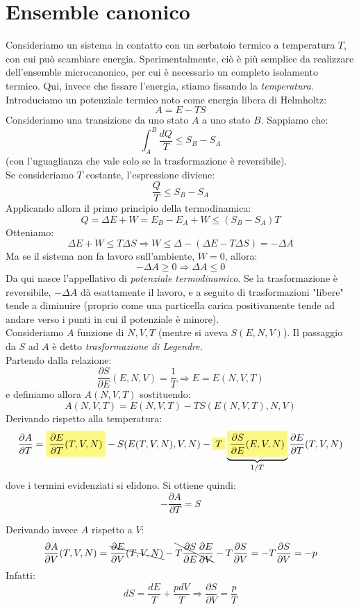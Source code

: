 \documentclass[12pt]{article}
\begin{document}
\section{Ensemble canonico}
Consideriamo un sistema in contatto con un serbatoio termico a temperatura $T$, con cui può scambiare energia. Sperimentalmente, ciò è più semplice da realizzare dell'ensemble microcanonico, per cui è necessario un completo isolamento termico. Qui, invece che fissare l'energia, stiamo fissando la \textit{temperatura}.\\
Introduciamo un potenziale termico noto come energia libera di Helmholtz:
\[
A=E-TS
\]
Consideriamo una transizione da uno stato $A$ a uno stato $B$. Sappiamo che:
\[
\int_A^B \frac{dQ}{T}\leq S_B-S_A
\]
(con l'uguaglianza che vale solo se la trasformazione è reversibile).\\
Se consideriamo $T$ costante, l'espressione diviene:
\[
\frac{Q}{T}\leq S_B-S_A
\]
Applicando allora il primo principio della termodinamica:
\[
Q = \Delta E + W= E_B-E_A + W \leq (S_B-S_A)T
\]
Otteniamo:
\[
\Delta E+W\leq T\Delta S \Rightarrow W \leq \Delta -(\Delta E-T\Delta S) = -\Delta A
\]
Ma se il sistema non fa lavoro sull'ambiente, $W=0$, allora:
\[
-\Delta A \geq 0\Rightarrow \Delta A\leq 0
\]
Da qui nasce l'appellativo di \textit{potenziale termodinamico}. Se la trasformazione è reversibile, $-\Delta A$ dà esattamente il lavoro, e a seguito di trasformazioni "libere" tende a diminuire (proprio come una particella carica positivamente tende ad andare verso i punti in cui il potenziale è minore).\\
Consideriamo $A$ funzione di $N,V,T$ (mentre si aveva $S(E,N,V)$). Il passaggio da $S$ ad $A$ è detto \textit{trasformazione di Legendre.}\\
Partendo dalla relazione:
\[
\frac{\partial S}{\partial E}(E,N,V)=\frac{1}{T} \Rightarrow E=E(N,V,T)
\]
e definiamo allora $A(N,V,T)$ sostituendo:
\[
A(N,V,T)=E(N,V,T)-TS(E(N,V,T),N,V)
\]
Derivando rispetto alla temperatura:
\[
\frac{\partial A}{\partial T}=\hlc{Yellow}{\frac{\partial E}{\partial T}(T,V,N)} - S(E(T,V,N), V,N)-\hlc{Yellow}{T}\underbrace{\hlc{Yellow}{\frac{\partial S}{\partial E}(E,V,N)}}_{1/T}\frac{\partial E}{\partial T}(T,V,N)
\]
dove i termini evidenziati si elidono. Si ottiene quindi:
\[
-\frac{\partial A}{\partial T} = S
\]

Derivando invece $A$ rispetto a $V$:
\[
\frac{\partial A}{\partial V}(T,V,N) = \bcancel{\frac{\partial E}{\partial V}(T,V,N)}-\bcancel{T\frac{\partial S}{\partial E}\frac{\partial E}{\partial V}}-T\frac{\partial S}{\partial V} = -T\frac{\partial S}{\partial V} = -p
\]
Infatti:
\[
dS= \frac{dE}{T}+\frac{p dV}{T} \Rightarrow \frac{\partial S}{\partial V}=\frac{p}{T}
\]
\end{document}

